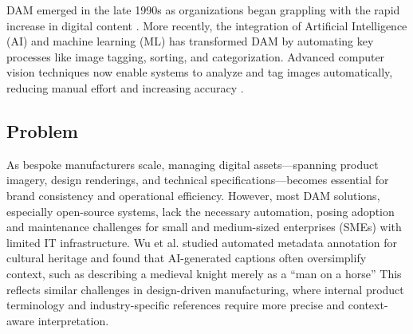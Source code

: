 \documentclass[a4paper,10pt,twocolumn]{article}
\numberwithin{figure}{section}
\numberwithin{table}{section}
\begin{document}
DAM emerged in the late 1990s as organizations began grappling 
with the rapid increase in digital content \citep{krogh2009}. 
More recently, the integration of Artificial Intelligence (AI) 
and machine learning (ML) has transformed DAM by automating key 
processes like image tagging, sorting, and categorization. Advanced computer 
vision techniques now enable systems to analyze and tag images automatically, 
reducing manual effort and increasing accuracy \citep{MINGfANG}.





\subsection{Problem}
As bespoke manufacturers scale, managing digital assets—spanning product imagery, design renderings,
and technical specifications—becomes essential for brand consistency and operational efficiency.
However, most DAM solutions, especially open-source systems, lack the necessary automation, 
posing adoption and maintenance challenges for small and medium-sized enterprises (SMEs) with limited IT infrastructure. 
Wu et al. studied automated metadata annotation for cultural heritage and found that AI-generated 
captions often oversimplify context, such as describing a medieval knight merely as a “man on a horse” \citep{MINGfANG} 
This reflects similar challenges in design-driven manufacturing, where internal product terminology and industry-specific 
references require more precise and context-aware interpretation.
\end{document}
